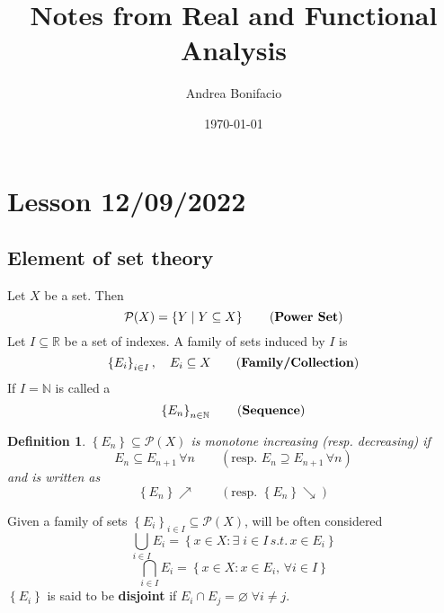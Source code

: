 \documentclass[a4paper,12pt]{article}
\theoremstyle{break}
\newtheorem{definition}{Definition}[section]
\let\emptyset\varnothing
\numberwithin{equation}{section}
\begin{document}
\title{Notes from Real and Functional Analysis}
\author{Andrea Bonifacio}
\date{\today}
\maketitle
\newpage

\section{Lesson 12/09/2022}

\subsection*{Element of set theory}
Let \(X\) be a set. Then 
\[
    \mathcal{P}(X) = \left\lbrace Y \; | \; Y \subseteq X \right\rbrace \tag{\textbf{Power Set}}
\]
Let \(I \subseteq \mathbb{R}\) be a set of indexes. A family of sets induced by \(I\) is 
\[
    \left\lbrace E_i \right\rbrace_{i \in I}, \quad E_i \subseteq X  \tag{\textbf{Family/Collection}}
\]
If \(I = \mathbb{N} \) is called a 
\[
    \left\lbrace E_n \right\rbrace_{n \in \mathbb{N}} \tag{\textbf{Sequence}}
\]
\begin{definition}
    \( \left\lbrace E_n \right\rbrace \subseteq \mathcal{P}(X) \) is monotone increasing (resp. decreasing) if 
    \[
        E_n \subseteq E_{n+1} \,\forall n \qquad (\mbox{resp. } E_n \supseteq E_{n+1} \, \forall n)
    \]
    and is written as 
    \[
        \left\lbrace E_n \right\rbrace \nearrow \qquad (\mbox{resp. }\left\lbrace E_n \right\rbrace \searrow)
    \]
\end{definition}
Given a family of sets \(\left\lbrace E_i \right\rbrace_{i \in I} \subseteq \mathcal{P}(X)\), will be often considered
\[
    \bigcup_{i \in I} E_i = \left\lbrace x \in X : \exists \; i \in I \, s.t. \, x \in E_i \right\rbrace 
\]
\[
    \bigcap_{i \in I} E_i = \left\lbrace x \in X : x \in E_i, \, \forall i \in I \right\rbrace
\]
\(\left\lbrace E_i \right\rbrace\) is said to be \textbf{disjoint} if \(E_i \cap E_j = \emptyset \; \forall i \not = j\).
\end{document}

